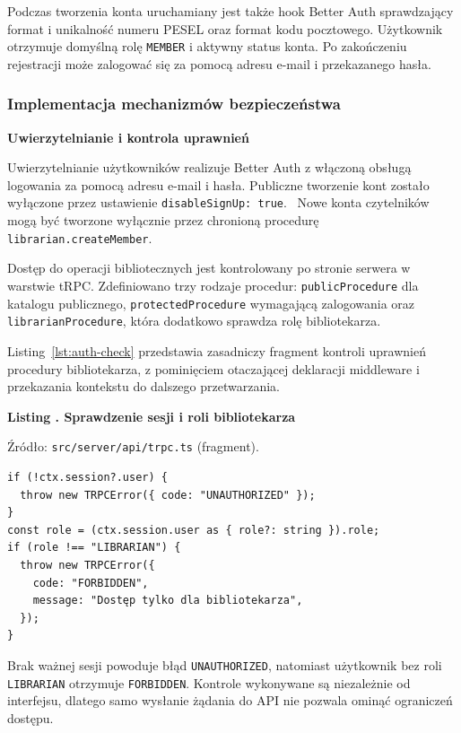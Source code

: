 \documentclass[11pt, a4paper]{article}
\begin{document}
Podczas tworzenia konta uruchamiany jest także hook Better Auth sprawdzający format i unikalność numeru PESEL oraz format kodu pocztowego. Użytkownik otrzymuje domyślną rolę \texttt{MEMBER} i aktywny status konta. Po zakończeniu rejestracji może zalogować się za pomocą adresu e-mail i przekazanego hasła.


\subsubsection{Implementacja mechanizmów bezpieczeństwa}
\label{subsec:implementacja-bezpieczenstwa}

\noindent\textbf{Uwierzytelnianie i kontrola uprawnień}

Uwierzytelnianie użytkowników realizuje Better Auth z włączoną obsługą logowania za pomocą adresu e-mail i hasła. Publiczne tworzenie kont zostało wyłączone przez ustawienie \texttt{disableSignUp: true}.~\cite{better-auth-email} Nowe konta czytelników mogą być tworzone wyłącznie przez chronioną procedurę \texttt{librarian.createMember}.

Dostęp do operacji bibliotecznych jest kontrolowany po stronie serwera w warstwie tRPC. Zdefiniowano trzy rodzaje procedur: \texttt{publicProcedure} dla katalogu publicznego, \texttt{protectedProcedure} wymagającą zalogowania oraz \texttt{librarianProcedure}, która dodatkowo sprawdza rolę bibliotekarza.

Listing~\ref{lst:auth-check} przedstawia zasadniczy fragment kontroli uprawnień procedury bibliotekarza, z pominięciem otaczającej deklaracji middleware i przekazania kontekstu do dalszego przetwarzania.

\noindent\textbf{Listing \thebdcode. Sprawdzenie sesji i roli bibliotekarza}
\label{lst:auth-check}
\par\nopagebreak
{\footnotesize
\noindent Źródło: \texttt{src/server/api/trpc.ts} (fragment).
\par\nopagebreak
\begin{verbatim}
if (!ctx.session?.user) {
  throw new TRPCError({ code: "UNAUTHORIZED" });
}
const role = (ctx.session.user as { role?: string }).role;
if (role !== "LIBRARIAN") {
  throw new TRPCError({
    code: "FORBIDDEN",
    message: "Dostęp tylko dla bibliotekarza",
  });
}
\end{verbatim}
}

Brak ważnej sesji powoduje błąd \texttt{UNAUTHORIZED}, natomiast użytkownik bez roli \texttt{LIBRARIAN} otrzymuje \texttt{FORBIDDEN}. Kontrole wykonywane są niezależnie od interfejsu, dlatego samo wysłanie żądania do API nie pozwala ominąć ograniczeń dostępu.
\end{document}
